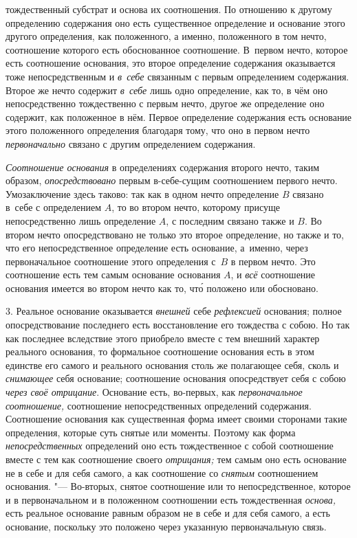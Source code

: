 тождественный субстрат и основа их соотношения. По отношению к другому
определению содержания оно есть существенное определение и основание этого
другого определения, как положенного, а именно, положенного в том нечто,
соотношение которого есть обоснованное соотношение. В~первом нечто, которое
есть соотношение основания, это второе определение содержания оказывается
тоже непосредственным и {\em в~себе} связанным с первым
определением содержания. Второе же нечто содержит
{\em в~себе} лишь одно определение, как то, в чём оно
непосредственно тождественно с первым нечто, другое же определение оно
содержит, как положенное в нём. Первое определение содержания есть
основание этого положенного определения благодаря тому, что оно в первом
нечто {\em первоначально} связано с другим определением
содержания.

{\em Соотношение основания} в определениях содержания
второго нечто, таким образом, {\em опосредствовано}
первым в-себе-сущим соотношением первого нечто. Умозаключение здесь таково:
так как в одном нечто определение $B$ связано в~себе
с определением $A$, то во втором нечто,
которому присуще непосредственно лишь определение
$A$, с последним связано также и
$B$. Во втором нечто опосредствовано не только это
второе определение, но также и то, что его непосредственное определение
есть основание, а~именно, через первоначальное соотношение этого
определения с~$B$ в первом нечто. Это соотношение
есть тем самым основание основания $A$, и
{\em всё} соотношение основания имеется во втором нечто
как то, чт\'{о} положено или обосновано.

3. Реальное основание оказывается {\em внешней} себе
{\em рефлексией} основания; полное опосредствование
последнего есть восстановление его тождества с собою. Но так как последнее
вследствие этого приобрело вместе с тем внешний характер реального
основания, то формальное соотношение основания есть в этом единстве его
самого и реального основания столь же полагающее себя, сколь и
{\em снимающее} себя основание; соотношение основания
опосредствует себя с собою {\em через своё отрицание}.
Основание есть, во-первых, как {\em первоначальное соотношение,}
соотношение непосредственных
определений содержания. Соотношение основания как существенная форма имеет
своими сторонами такие определения, которые суть снятые или моменты.
Поэтому как форма {\em непосредственных} определений
оно есть тождественное с собой соотношение вместе с тем как соотношение
своего {\em отрицания;} тем самым оно есть основание не
в себе и для себя самого, а как соотношение со
{\em снятым} соотношением основания. "--- Во-вторых,
снятое соотношение или то непосредственное, которое и в первоначальном и в
положенном соотношении есть тождественная {\em основа,}
есть реальное основание равным образом не в себе и для себя самого, а есть
основание, поскольку это положено через указанную первоначальную связь.

